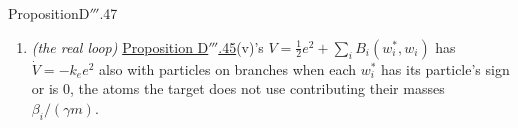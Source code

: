 \begin{thm}{Proposition}{D$'''$.47}
\begin{enumerate}[label=\textup{(\roman*)}]
    typically tiny: over all the three-atom supports of the instances the median margin is far below the showcase
    targets', a large fraction has no certificate in double precision (exact margins of order $10^{-32}$), and there
    nonnegative fits carrying $O(1)$ mass off the support exist to rounding --- the selection then is invisible on any
    reachable horizon, the masses lingering on the target's neighbouring atoms (numerics E). Uniqueness alone does not
    make the target reachable; stability constants (Eftekhari et al.) govern it.
  \item \emph{(the real loop)} \hyperref[res:thmDppp:45]{Proposition D$'''$.45}(v)'s
    $V = \tfrac12e^2 + \sum_iB_i(w^*_i,w_i)$ has $\dot V = -k_ee^2$ also with particles on branches when each $w^*_i$
    has its particle's sign or is 0, the atoms the target does not use contributing their masses $\beta_i/(\gamma m)$.
\end{enumerate}
\end{thm}

